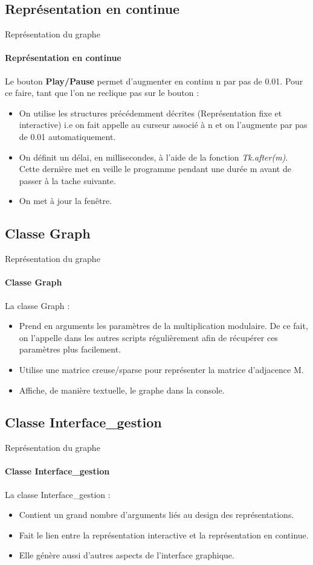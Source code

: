 \documentclass{beamer}
\begin{document}
\subsection{Représentation en continue}
\begin{frame}{Représentation du graphe}
\framesubtitle{Représentation en continue}
Le bouton \textbf{Play/Pause} permet d'augmenter en continu n par pas de 0.01. Pour ce faire, tant que l'on ne reclique pas sur le bouton :  
\begin{itemize}
\item On utilise les structures précédemment décrites (Représentation fixe et interactive) i.e on fait appelle au curseur associé à n et on l'augmente par pas de 0.01 automatiquement.
\item On définit un délai, en millisecondes, à l'aide de la fonction \textit{Tk.after(m)}. Cette dernière met en veille le programme  pendant une durée m avant de passer à la tache suivante.
\item On met à jour la fenêtre.
\end{itemize} 
\end{frame}

\subsection{Classe Graph}
\begin{frame}{Représentation du graphe}
\framesubtitle{Classe Graph}
La classe Graph :
\begin{itemize}
\item Prend en arguments les paramètres de la multiplication modulaire. De ce fait, on l'appelle dans les autres scripts régulièrement afin de récupérer ces paramètres plus facilement.
\item Utilise une matrice creuse/sparse pour représenter la matrice d'adjacence M.
\item Affiche, de manière textuelle, le graphe dans la console.
\end{itemize}
\end{frame}

\subsection{Classe Interface\_gestion}
\begin{frame}{Représentation du graphe}
\framesubtitle{Classe Interface\_gestion}
La classe Interface\_gestion : 
\begin{itemize}
\item Contient un grand nombre d'arguments liés au design des représentations.
\item Fait le lien entre la représentation interactive et la représentation en continue.
\item Elle génère aussi d'autres aspects de l'interface graphique. 

\end{itemize}
\end{frame}
\end{document}
